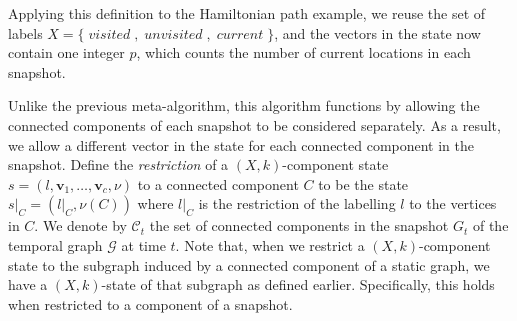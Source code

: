 \documentclass[a4paper,UKenglish,cleveref, autoref, thm-restate]{lipics-v2021} %
\DeclareMathOperator{\visited}{\textit{visited}}
\DeclareMathOperator{\unvisited}{\textit{unvisited}}
\DeclareMathOperator{\current}{\textit{current}}
\begin{document}
Applying this definition to the Hamiltonian path example, we reuse the set of 
labels $X=\{\visited,\unvisited,\current\}$, and the vectors in the state now contain one integer $p$, which counts the number of current locations in each snapshot. 



Unlike the previous meta-algorithm, this algorithm functions by allowing the connected components of each snapshot to be considered separately. As a result, we allow a different vector in the state for each connected component in the snapshot. Define the \emph{restriction} of a $(X,k)$-component state $s=(l,\textbf{v}_1,\ldots,\textbf{v}_c, \nu)$ to a connected component $C$ to be the state $s|_C=(l|_C,\nu(C))$ where $l|_C$ is the restriction of the labelling $l$ to the vertices in $C$. We denote by $\mathcal{C}_t$ the set of connected components in the snapshot $G_t$ of the temporal graph $\mathcal{G}$ at time $t$.  Note that, when we restrict a $(X,k)$-component state to the subgraph induced by a connected component of a static graph, we have a $(X,k)$-state of that subgraph as defined earlier. Specifically, this holds when restricted to a component of a snapshot.
\end{document}

